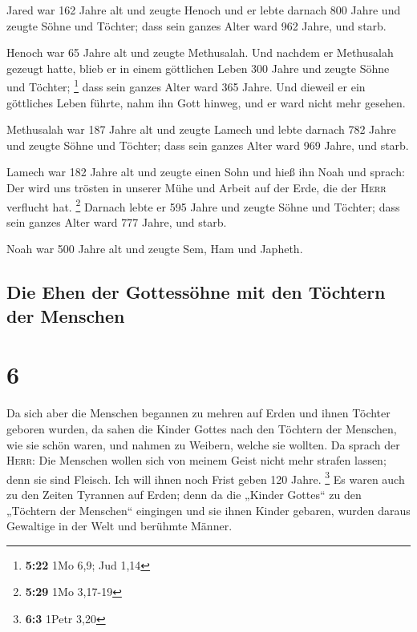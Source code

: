  Jared war 162 Jahre alt und zeugte Henoch
 und er lebte darnach 800 Jahre und zeugte Söhne und
Töchter;  dass sein ganzes Alter ward 962 Jahre, und
starb.

 Henoch war 65 Jahre alt und zeugte Methusalah.
 Und nachdem er Methusalah gezeugt hatte, blieb er in
einem göttlichen Leben 300 Jahre und zeugte Söhne und Töchter;
\footnote{\textbf{5:22} 1Mo 6,9; Jud 1,14}  dass sein
ganzes Alter ward 365 Jahre.  Und dieweil er ein
göttliches Leben führte, nahm ihn Gott hinweg, und er ward nicht mehr
gesehen.

 Methusalah war 187 Jahre alt und zeugte Lamech
 und lebte darnach 782 Jahre und zeugte Söhne und
Töchter;  dass sein ganzes Alter ward 969 Jahre, und
starb.

 Lamech war 182 Jahre alt und zeugte einen Sohn
 und hieß ihn Noah und sprach: Der wird uns trösten in
unserer Mühe und Arbeit auf der Erde, die der \textsc{Herr} verflucht
hat. \footnote{\textbf{5:29} 1Mo 3,17-19}  Darnach lebte
er 595 Jahre und zeugte Söhne und Töchter;  dass sein
ganzes Alter ward 777 Jahre, und starb.

 Noah war 500 Jahre alt und zeugte Sem, Ham und Japheth.

\hypertarget{die-ehen-der-gottessuxf6hne-mit-den-tuxf6chtern-der-menschen}{%
\subsection{Die Ehen der Gottessöhne mit den Töchtern der
Menschen}\label{die-ehen-der-gottessuxf6hne-mit-den-tuxf6chtern-der-menschen}}

\hypertarget{section-5}{%
\section{6}\label{section-5}}

 Da sich aber die Menschen begannen zu mehren auf Erden
und ihnen Töchter geboren wurden,  da sahen die Kinder
Gottes nach den Töchtern der Menschen, wie sie schön waren, und nahmen
zu Weibern, welche sie wollten.  Da sprach der
\textsc{Herr}: Die Menschen wollen sich von meinem Geist nicht mehr
strafen lassen; denn sie sind Fleisch. Ich will ihnen noch Frist geben
120 Jahre. \footnote{\textbf{6:3} 1Petr 3,20}  Es waren
auch zu den Zeiten Tyrannen auf Erden; denn da die „Kinder Gottes`` zu
den „Töchtern der Menschen`` eingingen und sie ihnen Kinder gebaren,
wurden daraus Gewaltige in der Welt und berühmte Männer.

